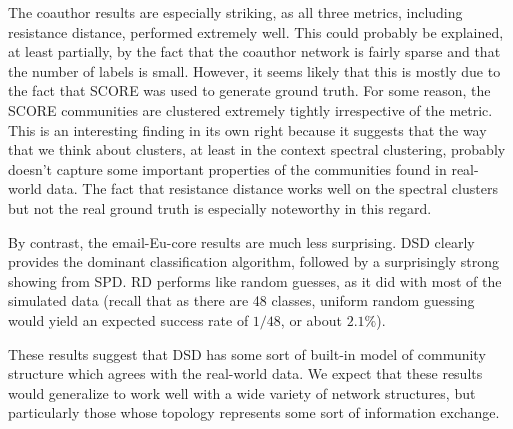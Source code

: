 The coauthor results are especially striking, as all three metrics, including resistance distance,
performed extremely well. This could probably be explained, at least partially, by the fact that the
coauthor network is fairly sparse and that the number of labels is small. However, it seems likely
that this is mostly due to the fact that SCORE was used to generate ground truth. For some reason,
the SCORE communities are clustered extremely tightly irrespective of the metric. This is an
interesting finding in its own right because it suggests that the way that we think about clusters,
at least in the context spectral clustering, probably doesn't capture some important properties of
the communities found in real-world data. The fact that resistance distance works well on the
spectral clusters but not the real ground truth is especially noteworthy in this regard.

By contrast, the email-Eu-core results are much less surprising. DSD clearly provides the dominant
classification algorithm, followed by a surprisingly strong showing from SPD. RD performs like
random guesses, as it did with most of the simulated data (recall that as there are 48 classes,
uniform random guessing would yield an expected success rate of $1/48$, or about $2.1\%$).

These results suggest that DSD has some sort of built-in model of community structure which agrees
with the real-world data. We expect that these results would generalize to work well with a wide
variety of network structures, but particularly those whose topology represents some sort of
information exchange.


